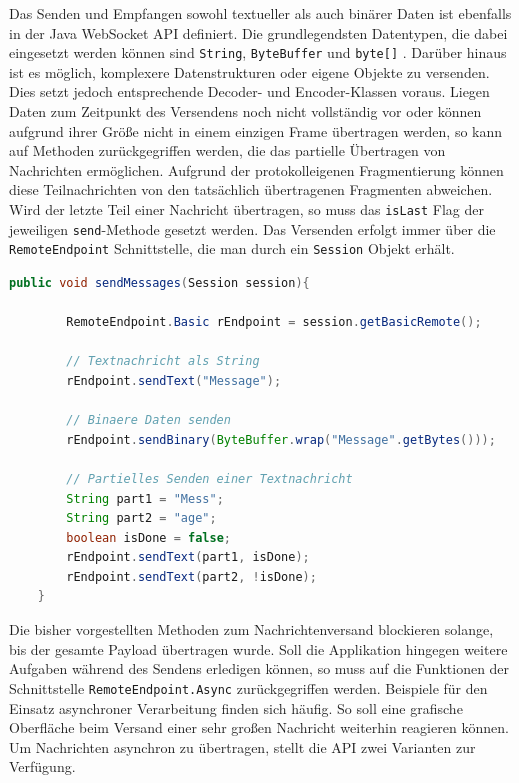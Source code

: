 \documentclass[11pt,a4paper,titlepage]{scrartcl}
\numberwithin{equation}{section}
\begin{document}
\noindent Das Senden und Empfangen sowohl textueller als auch binärer Daten ist ebenfalls in der Java WebSocket API definiert. Die grundlegendsten Datentypen, die dabei eingesetzt werden können sind \texttt{String}, \texttt{ByteBuffer} und \texttt{byte[]} \autocite[30]{coward_java_2014}. Darüber hinaus ist es möglich, komplexere Datenstrukturen oder eigene Objekte zu versenden. Dies setzt jedoch entsprechende Decoder- und Encoder-Klassen voraus. Liegen Daten zum Zeitpunkt des Versendens noch nicht vollständig vor oder können aufgrund ihrer Größe nicht in einem einzigen Frame übertragen werden, so kann auf Methoden zurückgegriffen werden, die das partielle Übertragen von Nachrichten ermöglichen. Aufgrund der protokolleigenen Fragmentierung können diese Teilnachrichten von den tatsächlich übertragenen Fragmenten abweichen. Wird der letzte Teil einer Nachricht übertragen, so muss das \texttt{isLast} Flag der jeweiligen \texttt{send}-Methode gesetzt werden. Das Versenden erfolgt immer über die \texttt{RemoteEndpoint} Schnittstelle, die man durch ein \texttt{Session} Objekt erhält. \\

\begin{lstlisting}[frame=single, language=Java, caption=Java: Synchrone Nachrichtenübertragung]
	public void sendMessages(Session session){
	
		RemoteEndpoint.Basic rEndpoint = session.getBasicRemote();
		
		// Textnachricht als String
		rEndpoint.sendText("Message");
		
		// Binaere Daten senden
		rEndpoint.sendBinary(ByteBuffer.wrap("Message".getBytes()));
		
		// Partielles Senden einer Textnachricht
		String part1 = "Mess";
		String part2 = "age";
		boolean isDone = false;
		rEndpoint.sendText(part1, isDone);
		rEndpoint.sendText(part2, !isDone);
	}
\end{lstlisting}

\noindent Die bisher vorgestellten Methoden zum Nachrichtenversand blockieren solange, bis der gesamte Payload übertragen wurde. Soll die Applikation hingegen weitere Aufgaben während des Sendens erledigen können, so muss auf die Funktionen der Schnittstelle \texttt{RemoteEndpoint.Async} zurückgegriffen werden. Beispiele für den Einsatz asynchroner Verarbeitung finden sich häufig. So soll eine grafische Oberfläche beim Versand einer sehr großen Nachricht weiterhin reagieren können. Um Nachrichten asynchron zu übertragen, stellt die API zwei Varianten zur Verfügung. \\
\end{document}
